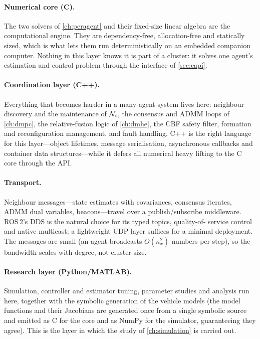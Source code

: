 \paragraph{Numerical core (C).} The two solvers of \cref{ch:peragent} and their
fixed-size linear algebra are the computational engine. They are dependency-free,
allocation-free and statically sized, which is what lets them run deterministically
on an embedded companion computer. Nothing in this layer knows it is part of a
cluster: it solves one agent's estimation and control problem through the
interface of \cref{sec:capi}.

\paragraph{Coordination layer (C++).} Everything that becomes harder in a
many-agent system lives here: neighbour discovery and the maintenance of
$\mathcal{N}_i$, the consensus and ADMM loops of \cref{ch:dmpc}, the relative-fusion
logic of \cref{ch:dmhe}, the CBF safety filter, formation and reconfiguration
management, and fault handling. C++ is the right language for this layer---object
lifetimes, message serialisation, asynchronous callbacks and container data
structures---while it defers all numerical heavy lifting to the C core through
the API.

\paragraph{Transport.} Neighbour messages---state estimates with covariances,
consensus iterates, ADMM dual variables, beacons---travel over a publish/subscribe
middleware. ROS\,2's DDS is the natural choice for its typed topics, quality-of-%
service control and native multicast; a lightweight UDP layer suffices for a
minimal deployment. The messages are small (an agent broadcasts $O(n_x^2)$ numbers
per step), so the bandwidth scales with degree, not cluster size.

\paragraph{Research layer (Python/MATLAB).} Simulation, controller and estimator
tuning, parameter studies and analysis run here, together with the symbolic
generation of the vehicle models (the model functions and their Jacobians are
generated once from a single symbolic source and emitted as C for the core and as
NumPy for the simulator, guaranteeing they agree). This is the layer in which the
study of \cref{ch:simulation} is carried out.


